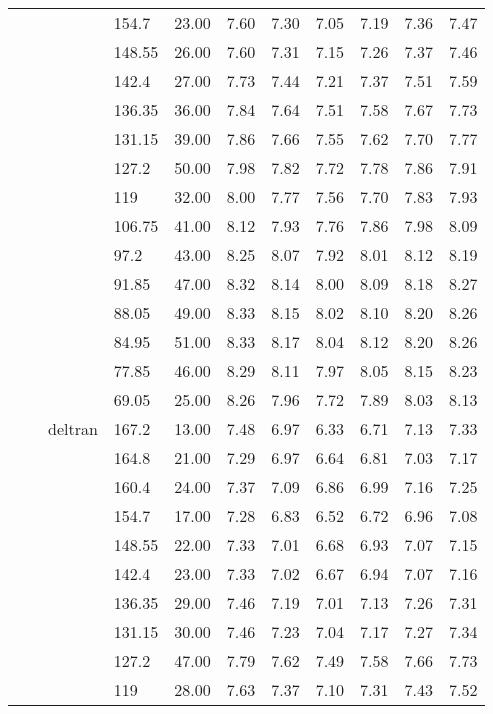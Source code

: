 \begin{longtable}{llllrrrrrrr}
   &  &  & 154.7 & 23.00 & 7.60 & 7.30 & 7.05 & 7.19 & 7.36 & 7.47 \\ 
   &  &  & 148.55 & 26.00 & 7.60 & 7.31 & 7.15 & 7.26 & 7.37 & 7.46 \\ 
   &  &  & 142.4 & 27.00 & 7.73 & 7.44 & 7.21 & 7.37 & 7.51 & 7.59 \\ 
   &  &  & 136.35 & 36.00 & 7.84 & 7.64 & 7.51 & 7.58 & 7.67 & 7.73 \\ 
   &  &  & 131.15 & 39.00 & 7.86 & 7.66 & 7.55 & 7.62 & 7.70 & 7.77 \\ 
   &  &  & 127.2 & 50.00 & 7.98 & 7.82 & 7.72 & 7.78 & 7.86 & 7.91 \\ 
   &  &  & 119 & 32.00 & 8.00 & 7.77 & 7.56 & 7.70 & 7.83 & 7.93 \\ 
   &  &  & 106.75 & 41.00 & 8.12 & 7.93 & 7.76 & 7.86 & 7.98 & 8.09 \\ 
   &  &  & 97.2 & 43.00 & 8.25 & 8.07 & 7.92 & 8.01 & 8.12 & 8.19 \\ 
   &  &  & 91.85 & 47.00 & 8.32 & 8.14 & 8.00 & 8.09 & 8.18 & 8.27 \\ 
   &  &  & 88.05 & 49.00 & 8.33 & 8.15 & 8.02 & 8.10 & 8.20 & 8.26 \\ 
   &  &  & 84.95 & 51.00 & 8.33 & 8.17 & 8.04 & 8.12 & 8.20 & 8.26 \\ 
   &  &  & 77.85 & 46.00 & 8.29 & 8.11 & 7.97 & 8.05 & 8.15 & 8.23 \\ 
   &  &  & 69.05 & 25.00 & 8.26 & 7.96 & 7.72 & 7.89 & 8.03 & 8.13 \\ 
   &  & deltran & 167.2 & 13.00 & 7.48 & 6.97 & 6.33 & 6.71 & 7.13 & 7.33 \\ 
   &  &  & 164.8 & 21.00 & 7.29 & 6.97 & 6.64 & 6.81 & 7.03 & 7.17 \\ 
   &  &  & 160.4 & 24.00 & 7.37 & 7.09 & 6.86 & 6.99 & 7.16 & 7.25 \\ 
   &  &  & 154.7 & 17.00 & 7.28 & 6.83 & 6.52 & 6.72 & 6.96 & 7.08 \\ 
   &  &  & 148.55 & 22.00 & 7.33 & 7.01 & 6.68 & 6.93 & 7.07 & 7.15 \\ 
   &  &  & 142.4 & 23.00 & 7.33 & 7.02 & 6.67 & 6.94 & 7.07 & 7.16 \\ 
   &  &  & 136.35 & 29.00 & 7.46 & 7.19 & 7.01 & 7.13 & 7.26 & 7.31 \\ 
   &  &  & 131.15 & 30.00 & 7.46 & 7.23 & 7.04 & 7.17 & 7.27 & 7.34 \\ 
   &  &  & 127.2 & 47.00 & 7.79 & 7.62 & 7.49 & 7.58 & 7.66 & 7.73 \\ 
   &  &  & 119 & 28.00 & 7.63 & 7.37 & 7.10 & 7.31 & 7.43 & 7.52 \\ 

\end{longtable}
